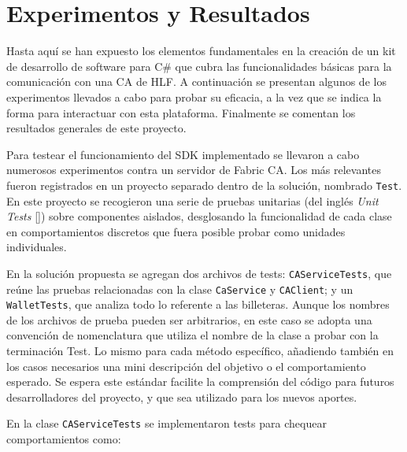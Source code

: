 \chapter{Experimentos y Resultados}\label{chapter:implementation}
Hasta aqu\'i se han expuesto los elementos fundamentales en la creaci\'on de un kit de desarrollo de software para C\# que cubra las funcionalidades b\'asicas para la comunicaci\'on con una CA de HLF. A continuaci\'on se presentan algunos de los experimentos llevados a cabo para probar su eficacia, a la vez que se indica la forma para interactuar con esta plataforma. Finalmente se comentan los resultados generales de este proyecto.

Para testear el funcionamiento del SDK implementado se llevaron a cabo numerosos experimentos contra un servidor de Fabric CA. Los m\'as relevantes fueron registrados en un proyecto separado dentro de la soluci\'on, nombrado \texttt{Test}. En este proyecto se recogieron una serie de pruebas unitarias (del ingl\'es \emph{Unit Tests} [\cite{unittestvs}]) sobre componentes aislados, desglosando la funcionalidad de cada clase en comportamientos discretos que fuera posible probar como unidades individuales.

En la soluci\'on propuesta se agregan dos archivos de tests: \texttt{CAServiceTests}, que re\'une las pruebas relacionadas con la clase \texttt{CaService} y \texttt{CAClient}; y un \texttt{WalletTests}, que analiza todo lo referente a las billeteras. Aunque los nombres de los archivos de prueba pueden ser arbitrarios, en este caso se adopta una convención de nomenclatura que utiliza el nombre de la clase a probar con la terminaci\'on Test. Lo mismo para cada m\'etodo espec\'ifico, a\~nadiendo tambi\'en en los casos necesarios una mini descripci\'on del objetivo o el comportamiento esperado. Se espera este estándar facilite la comprensi\'on del c\'odigo para futuros desarrolladores del proyecto, y que sea utilizado para los nuevos aportes.

En la clase \texttt{CAServiceTests} se implementaron tests para chequear comportamientos como: 

